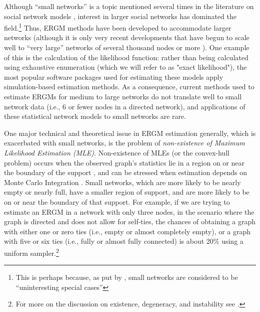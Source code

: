 \documentclass[review, nonatbib,doubleblind]{elsarticle/elsarticle}
\begin{document}
Although ``small networks'' is a topic mentioned several times in the literature on social network models  \cite{Wasserman1996,Frank1986,Snijders2011},  interest in larger social networks has dominated the field.\footnote{This is perhaps because, as put by \cite{Snijders2011}, small networks are considered to be ``uninteresting special cases''} Thus, ERGM methods have been developed to accommodate larger networks (although it is only very recent developments that have begun to scale well to ``very large'' networks of several thousand nodes or more \cite{Stivala2020}). One example of this is the calculation of the likelihood function: rather than being calculated using exhaustive enumeration (which we will refer to as "exact likelihood"), the most popular software packages used for estimating these models apply simulation-based estimation methods. As a consequence, current methods used to estimate ERGMs for medium to large networks do not translate well to small network data (i.e., 6 or fewer nodes in a directed network), and applications of these statistical network models to small networks are rare.  

One major technical and theoretical issue in ERGM estimation generally, which is exacerbated with small networks, is the problem of \textit{non-existence of Maximum Likelihood Estimation (MLE)}. Non-existence of MLEs (or the convex-hull problem) occurs when the observed graph's statistics lie in a region on or near the boundary of the support \cite{Barndorff-Nielsen2014}, and can be stressed when estimation depends on Monte Carlo Integration \cite{Handcock2003}. Small networks, which are more likely to be nearly empty or nearly full, have a smaller region of support, and are more likely to be on or near the boundary of that support. For example, if we are trying to estimate an ERGM in a network with only three nodes, in the scenario where the graph is directed and does not allow for self-ties, the chances of obtaining a graph with either one or zero ties (i.e., empty or almost completely empty), or a graph with five or six ties (i.e., fully or almost fully connected) is about 20\% using a uniform sampler.\footnote{For more on the discussion on existence, degeneracy, and instability see \cite{Jacobsen1989,Rinaldo2009,Schweinberger2011}.}
\end{document}
